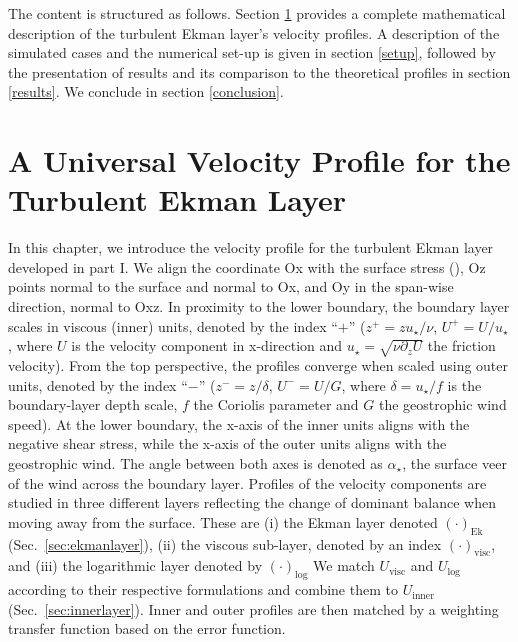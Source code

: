 \documentclass[smallcondensed,final]{svjour3}
\newcommand{\p}{\partial}
\begin{document}
The content is structured as follows. Section \ref{universal_profile} provides a complete mathematical description of the turbulent Ekman layer's velocity profiles. A description of the simulated cases and the numerical set-up is given in section \ref{setup}, followed by the presentation of results and its comparison to the theoretical profiles in section \ref{results}. We conclude in section \ref{conclusion}.

\section{A Universal Velocity Profile for the Turbulent Ekman Layer}
\label{universal_profile}

In this chapter, we introduce the velocity profile for the turbulent Ekman layer developed in part I. 
We align the coordinate Ox with the surface stress (\cite{ansorge:BM2019}), Oz points normal to the surface and normal to Ox, and Oy in the span-wise direction, normal to Oxz. In proximity to the lower boundary, the boundary layer scales in viscous (inner) units, denoted by the index ``$+$'' ($z^+ = zu_\star/\nu$, $U^+=U/u_\star$, where $U$ is the velocity component in x-direction and $u_\star = \sqrt{\nu \p_z U}$ the friction velocity). From the top perspective, the profiles converge when scaled using outer units, denoted by the index ``$-$'' ($z^-=z/\delta$, $U^-=U/G$, where $\delta=u_\star/f$ is the boundary-layer depth scale, $f$ the Coriolis parameter and $G$ the geostrophic wind speed). 
At the lower boundary, the x-axis of the inner units aligns with the negative shear stress, while the x-axis of the outer units aligns with the geostrophic wind. The angle between both axes is denoted as $\alpha_\star$, the surface veer of the wind across the boundary layer. 
%
Profiles of the velocity components are studied in three different layers reflecting the change of dominant balance when moving away from the surface. These are
(i) the Ekman layer denoted $(\cdot)_\text{Ek}$ (Sec.~\ref{sec:ekmanlayer}), 
(ii) the viscous sub-layer, denoted by an index $(\cdot)_\text{visc}$, 
and (iii) the logarithmic layer denoted by $(\cdot)_\text{log}$
We match $U_\text{visc}$ and $U_\text{log}$ according to their respective formulations and combine them to $U_\text{inner}$ (Sec.~\ref{sec:innerlayer}).
Inner and outer profiles are then matched by a weighting transfer function based on the error function. 
\end{document}
